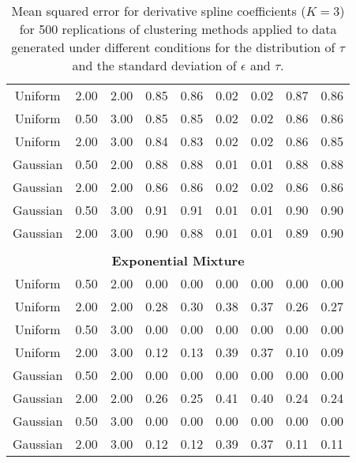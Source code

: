 \begin{table}[ht]
\begin{center}
\begin{tabular}{ccc|cccccc}
  Uniform & 2.00 & 2.00 & 0.85 & 0.86 & 0.02 & 0.02 & 0.87 & 0.86 \\ 
  Uniform & 0.50 & 3.00 & 0.85 & 0.85 & 0.02 & 0.02 & 0.86 & 0.86 \\ 
  Uniform & 2.00 & 3.00 & 0.84 & 0.83 & 0.02 & 0.02 & 0.86 & 0.85 \\ 
  Gaussian & 0.50 & 2.00 & 0.88 & 0.88 & 0.01 & 0.01 & 0.88 & 0.88 \\ 
  Gaussian & 2.00 & 2.00 & 0.86 & 0.86 & 0.02 & 0.02 & 0.86 & 0.86 \\ 
  Gaussian & 0.50 & 3.00 & 0.91 & 0.91 & 0.01 & 0.01 & 0.90 & 0.90 \\ 
  Gaussian & 2.00 & 3.00 & 0.90 & 0.88 & 0.01 & 0.01 & 0.89 & 0.90 \\ 
   \\ \multicolumn{9}{c}{\textbf{Exponential Mixture}}\\Uniform & 0.50 & 2.00 & 0.00 & 0.00 & 0.00 & 0.00 & 0.00 & 0.00 \\ 
  Uniform & 2.00 & 2.00 & 0.28 & 0.30 & 0.38 & 0.37 & 0.26 & 0.27 \\ 
  Uniform & 0.50 & 3.00 & 0.00 & 0.00 & 0.00 & 0.00 & 0.00 & 0.00 \\ 
  Uniform & 2.00 & 3.00 & 0.12 & 0.13 & 0.39 & 0.37 & 0.10 & 0.09 \\ 
  Gaussian & 0.50 & 2.00 & 0.00 & 0.00 & 0.00 & 0.00 & 0.00 & 0.00 \\ 
  Gaussian & 2.00 & 2.00 & 0.26 & 0.25 & 0.41 & 0.40 & 0.24 & 0.24 \\ 
  Gaussian & 0.50 & 3.00 & 0.00 & 0.00 & 0.00 & 0.00 & 0.00 & 0.00 \\ 
  Gaussian & 2.00 & 3.00 & 0.12 & 0.12 & 0.39 & 0.37 & 0.11 & 0.11 \\ 
   \hline\end{tabular}
\caption{Mean squared error for derivative spline coefficients ($K=3$) for 500 replications of clustering methods applied to data generated under different conditions for the distribution of $\tau$ and the standard deviation of $\epsilon$ and $\tau$.}
\label{tab:mse1}
\end{center}
\end{table}
